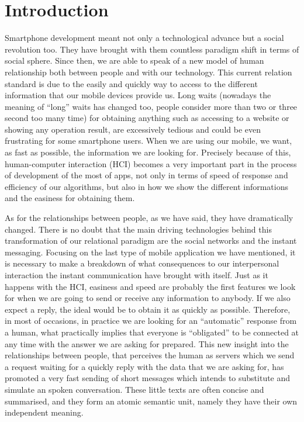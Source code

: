 \chapter{Introduction}
\label{cap:introduccion}


Smartphone development meant not only a technological advance but a social revolution too. They have brought with them countless paradigm shift in terms of social sphere. Since then, we are able to speak of a new model of human relationship both between people and with our technology. This current relation standard is due to the easily and quickly way to access to the different information that our mobile devices provide us. Long waits (nowadays the meaning of ``long'' waits has changed too, people consider more than two or three second too many time) for obtaining anything such as accessing to a website or showing any operation result, are excessively tedious and could be even frustrating for some smartphone users. When we are using our mobile, we want, as fast as possible, the information we are looking for. Precisely because of this, human-computer interaction (HCI) becomes a very important part in the process of development of the most of apps, not only in terms of speed of response and efficiency of our algorithms, but also in how we show the different informations and the easiness for obtaining them.

As for the relationships between people, as we have said, they have dramatically changed. There is no doubt that the main driving technologies behind this transformation of our relational paradigm are the social networks and the instant messaging. Focusing on the last type of mobile application we have mentioned, it is necessary to make a breakdown of what consequences to our interpersonal interaction the instant communication have brought with itself. Just as it happens with the HCI, easiness and speed are probably the first features we look for when we are going to send or receive any information to anybody. If we also expect a reply, the ideal would be to obtain it as quickly as possible. Therefore, in most of occasions, in practice we are looking for an ``automatic'' response from a human, what practically implies that everyone is ``obligated'' to be connected at any time with the answer we are asking for prepared. This new insight into the relationships between people, that perceives the human as servers which we send a request waiting for a quickly reply with the data that we are asking for, has promoted a very fast sending of short messages which intends to substitute and simulate an spoken conversation. These little texts are often concise and summarised, and they form an atomic semantic unit, namely they have their own independent meaning.


